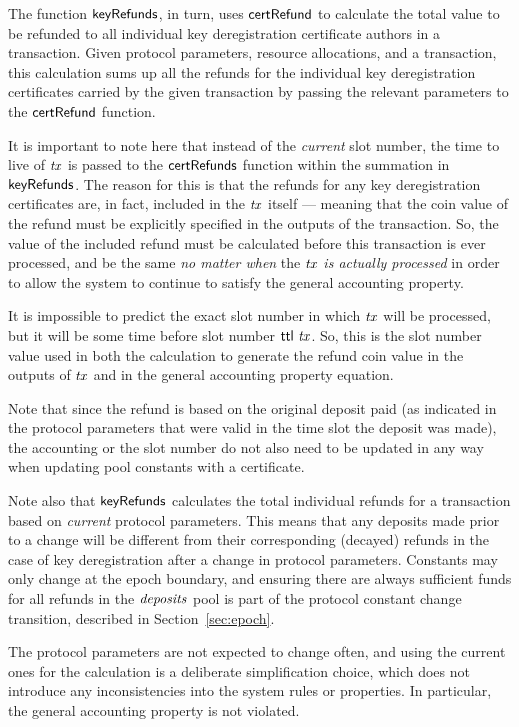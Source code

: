 \documentclass[11pt,a4paper,dvipsnames]{article}
\theoremstyle{definition}
\theoremstyle{definition}
\begin{document}
The function $\mathsf{keyRefunds}$, in turn, uses $\mathsf{certRefund}$ to calculate
the total value to be refunded to all individual key deregistration
certificate authors in a transaction.
Given protocol parameters, resource allocations, and a transaction,
this calculation sums up all the refunds for the individual key
deregistration certificates
carried by the given transaction by passing the relevant parameters to the
$\mathsf{certRefund}$ function.

It is important to note here that instead of the \textit{current} slot number,
the time to live of $\mathit{tx}$ is passed to the $\mathsf{certRefunds}$ function
within the summation in $\mathsf{keyRefunds}$. The reason for this is that the
refunds for any key deregistration certificates are, in fact, included in
the $\mathit{tx}$ itself --- meaning that the coin value of the refund must be
explicitly specified in the outputs of the transaction. So,
the value of the included refund must be calculated before this transaction
is ever processed, and be the same \textit{no matter when} the $\mathit{tx}$
\textit{is actually processed} in order to allow the system to continue to
satisfy the general accounting property.

It is impossible to predict the exact slot
number in which $\mathit{tx}$ will be processed, but it will be some time before
slot number $\mathsf{ttl}~\mathit{tx}$. So, this is the slot number value used in both
the calculation to generate the refund coin value in the outputs of $\mathit{tx}$
and in the general accounting property equation.

Note that since the refund is based
on the original deposit paid (as indicated in the protocol parameters that
were valid in the time slot the deposit was made), the accounting or the slot
number do not also need to be updated in any way when updating pool constants with
a certificate.

Note also that
$\mathsf{keyRefunds}$ calculates the total individual refunds for a transaction
based on \textit{current} protocol parameters. This means that any deposits
made prior to a change will be different from their corresponding
(decayed) refunds in the case of key deregistration after a change in
protocol parameters. Constants may only change at the epoch boundary, and
ensuring there are always sufficient funds for all
refunds in the $\mathit{deposits}$ pool is part of the protocol constant
change transition, described in Section~\ref{sec:epoch}.

The protocol parameters are not
expected to change often, and using the current ones for the calculation
is a deliberate simplification choice, which does not introduce any inconsistencies
into the system rules or properties. In particular, the general accounting
property is not violated.
\end{document}
